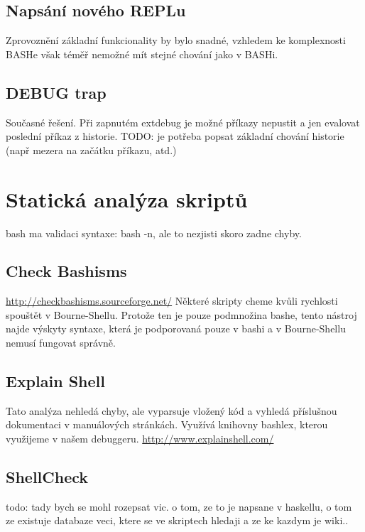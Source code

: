 \documentclass[thesis=M,czech]{FITthesis}[2012/06/26]
\begin{document}
\subsection{Napsání nového REPLu}
Zprovoznění základní funkcionality by bylo snadné, vzhledem ke komplexnosti BASHe však téměř nemožné mít stejné chování jako v BASHi.

\subsection{DEBUG trap}
Současné řešení. Při zapnutém extdebug je možné příkazy nepustit a jen evalovat poslední příkaz z historie. TODO: je potřeba popsat základní chování historie (např mezera na začátku příkazu, atd.)






\section{Statická analýza skriptů}

bash ma validaci syntaxe: bash -n, ale to nezjisti skoro zadne chyby.

\subsection{Check Bashisms}
\url{http://checkbashisms.sourceforge.net/}
Některé skripty cheme kvůli rychlosti spouštět v Bourne-Shellu. Protože ten je pouze podmnožina bashe, tento nástroj najde výskyty syntaxe, která je podporovaná pouze v bashi a v Bourne-Shellu nemusí fungovat správně.

\subsection{Explain Shell}
Tato analýza nehledá chyby, ale vyparsuje vložený kód a vyhledá příslušnou dokumentaci v manuálových stránkách. Využívá knihovny bashlex, kterou využijeme v našem debuggeru.
\url{http://www.explainshell.com/}


\subsection{ShellCheck}
todo: tady bych se mohl rozepsat vic. o tom, ze to je napsane v haskellu, o tom ze existuje databaze veci, ktere se ve skriptech hledaji a ze ke kazdym je wiki..

\end{document}
